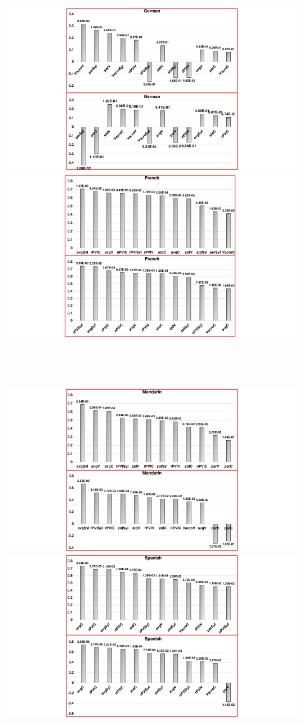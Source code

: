 \begin{figure}[]
        \begin{minipage}[t]{0.5\linewidth}
        \centering
            \includegraphics[width=3in]{figures/supra_seg_bar_plot/german.pdf}
        \end{minipage}%
        \begin{minipage}[t]{0.5\linewidth}
        \centering
            \includegraphics[width=3in]{figures/supra_seg_bar_plot/french.pdf}
        \end{minipage}%
        \\
        \begin{minipage}[t]{0.5\linewidth}
        \centering
            \includegraphics[width=3in]{figures/supra_seg_bar_plot/mandarin.pdf}
        \end{minipage}%
        \begin{minipage}[t]{0.5\linewidth}
        \centering
            \includegraphics[width=3in]{figures/supra_seg_bar_plot/spanish.pdf}

\end{minipage}
\end{figure}
